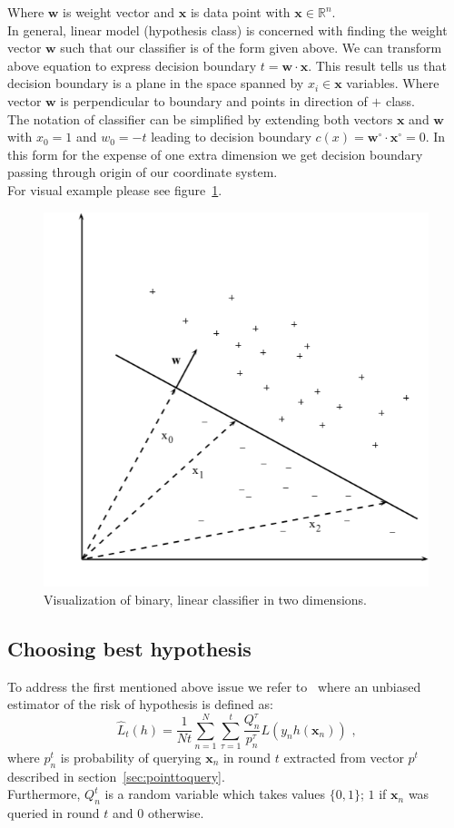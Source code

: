 \documentclass[12pt, a4paper, pdflatex]{report}
\begin{document}
Where $\mathbf{w}$ is weight vector and $\mathbf{x}$ is data point with $\mathbf{x} \in \mathbb{R}^n$.\\
In general, linear model (hypothesis class) is concerned with finding the weight vector $\mathbf{w}$ such that our classifier is of the form given above. We can transform above equation to express decision boundary $t = \mathbf{w} \cdot \mathbf{x}$. This result tells us that decision boundary is a plane in the space spanned by $x_i \in \mathbf{x}$ variables. Where vector $\mathbf{w}$ is perpendicular to boundary and points in direction of $+$ class.\\
The notation of classifier can be simplified by extending both vectors $\mathbf{x}$ and $\mathbf{w}$ with $x_0 = 1$ and $w_0 = -t$ leading to decision boundary $c(x) = \mathbf{w}^{\circ} \cdot \mathbf{x}^{\circ} = 0$. In this form for the expense of one extra dimension we get decision boundary passing through origin of our coordinate system.\\
For visual example please see figure~\ref{fig:binclas}.\\

\begin{figure}[htbp]
  \centering
  \includegraphics[width=0.5\linewidth]{graphics/binclas.png}
  \begin{tiny}
    \caption{Visualization of binary, linear classifier in two dimensions.\label{fig:binclas}}
  \end{tiny}
  \vspace{1cm}
\end{figure}

\subsection{Choosing best hypothesis}
To address the first mentioned above issue we refer to~\cite{DBLP:journals/corr/GantiG13} where an unbiased estimator of the risk of hypothesis is defined as:\\
\begin{equation}\label{eq:mean}
\hat{L}_t(h) = \frac{1}{Nt} \sum_{n=1}^{N} \sum_{\tau = 1}^{t} \frac{Q^{\tau}_n}{p^{\tau}_n} L(y_n h(\mathbf{x}_n)) \text{~,}
\end{equation}
where $p^t_n$ is probability of querying $\mathbf{x}_n$ in round $t$ extracted from vector $p^t$ described in section~\ref{sec:pointtoquery}.\\
Furthermore, $Q^t_n$ is a random variable which takes values $\{0,1\}$; $1$ if $\mathbf{x}_n$ was queried in round $t$ and $0$ otherwise.\\
\end{document}
